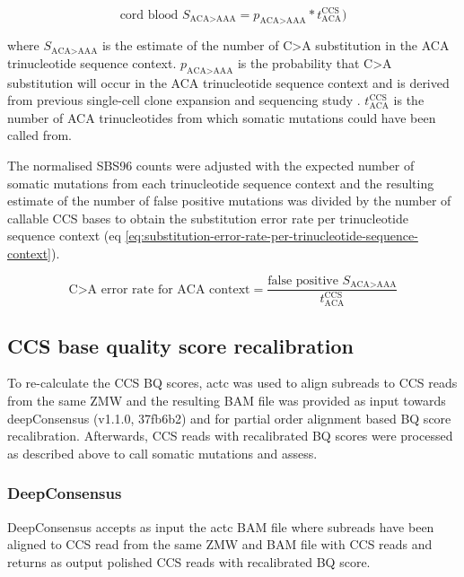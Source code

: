 \begin{equation} \label{eq:mutation-count-estimation}
\text{cord blood } S_{\text{ACA>AAA}}= p_{\text{ACA>AAA}} * t^{\text{CCS}}_{\text{ACA}})
\end{equation}

where $S_{\text{ACA>AAA}}$ is the estimate of the number of C>A substitution in the ACA trinucleotide sequence context. $p_{\text{ACA>AAA}}$ is the probability that C>A substitution will occur in the ACA trinucleotide sequence context and is derived from previous single-cell clone expansion and sequencing study \cite{Mitchell2022-ry}. $t^{\text{CCS}}_{\text{ACA}}$ is the number of ACA trinucleotides from which somatic mutations could have been called from.

The normalised SBS96 counts were adjusted with the expected number of somatic mutations from each trinucleotide sequence context and the resulting estimate of the number of false positive mutations was divided by the number of callable CCS bases to obtain the substitution error rate per trinucleotide sequence context (eq \ref{eq:substitution-error-rate-per-trinucleotide-sequence-context}). 

\begin{equation} \label{eq:substitution-error-rate-per-trinucleotide-sequence-context}
\text{C>A error rate for ACA context} = \frac{\text{false positive } S_{\text{ACA>AAA}}}{t^{\text{CCS}}_{\text{ACA}}}
\end{equation}





\subsection{CCS base quality score recalibration}

To re-calculate the CCS BQ scores, actc \cite{actc} was used to align subreads to CCS reads from the same ZMW and the resulting BAM file was provided as input towards deepConsensus (v1.1.0, 37fb6b2) \cite{Baid2022-or} and for partial order alignment based BQ score recalibration. Afterwards, CCS reads with recalibrated BQ scores were processed as described above to call somatic mutations and assess. 

\subsubsection{DeepConsensus}

DeepConsensus accepts as input the actc BAM file where subreads have been aligned to CCS read from the same ZMW and BAM file with CCS reads and returns as output polished CCS reads with recalibrated BQ score. 


